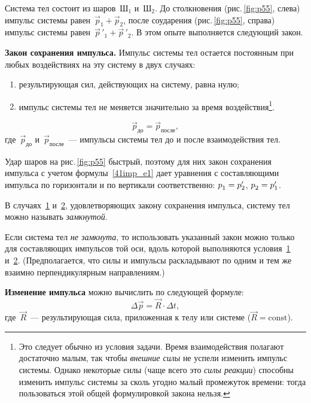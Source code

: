 \documentclass[main.tex]{subfiles}
\begin{document}
Система тел состоит из шаров~Ш$_1$ и~Ш$_2$. До столкновения (рис.\,\ref{fig:p55}, слева) импульс системы равен~$\vec p_1+\vec p_2$, после соударения (рис.\,\ref{fig:p55}, справа) импульс системы равен~$\vec p\,'_{\!1}+\vec p\,'_{\!2}$. В этом опыте выполняется следующий закон.
%
%
\begin{law}
    \textbf{Закон сохранения импульса.} Импульс системы тел остается постоянным при любых воздействиях на эту систему в двух случаях:
    \begin{enumerate}
        \item [1)] \hypertarget{с1}{} результирующая сил, действующих на систему, равна нулю;
        \item [2)] \hypertarget{с2}{} импульс системы тел не меняется значительно за время воздействия\footnote{Это следует обычно из условия задачи. Время взаимодействия полагают достаточно малым, так чтобы \emph{внешние силы} не успели изменить импульс системы. Однако некоторые силы (чаще всего это \emph{силы реакции}) способны изменить импульс системы за сколь угодно малый промежуток времени: тогда пользоваться этой общей формулировкой закона нельзя.}.
    \end{enumerate}
    \begin{equation}
        \vec p_\text{до}=\vec p_\text{после},
    \end{equation}
    где~$\vec p_\text{до}$ и~$\vec p_\text{после}$~--- импульсы системы тел до и после взаимодействия тел. 
\end{law}
%
Удар шаров на рис.\,\ref{fig:p55} быстрый, поэтому для них закон сохранения импульса с учетом формулы~\eqref{41imp_e1} дает уравнения с составляющими импульса по горизонтали и по вертикали соответственно: $p^{\vphantom{'}}_\text{1}=p'_{2}$, $p^{\vphantom{'}}_\text{2}=p'_{1}$.

В случаях~\hyperlink{с1}{1} и~\hyperlink{с2}{2}, удовлетворяющих закону сохранения импульса, систему тел можно называть \emph{замкнутой}.

Если система тел \emph{не замкнута}, то использовать указанный закон можно только для составляющих импульсов той оси, вдоль которой выполняются условия~\hyperlink{с1}{1} и~\hyperlink{с2}{2}. (Предполагается, что силы и импульсы раскладывают по одним и тем же взаимно перпендикулярным направлениям.) 

\textbf{Изменение импульса} можно вычислить по следующей формуле:
\begin{equation}
    \Delta \vec p=\vec R\cdot\Delta t,
\end{equation}
где~$\vec R$~--- результирующая сила, приложенная к телу или системе ($\vec R=\mathrm{const}$).











 
\end{document}
